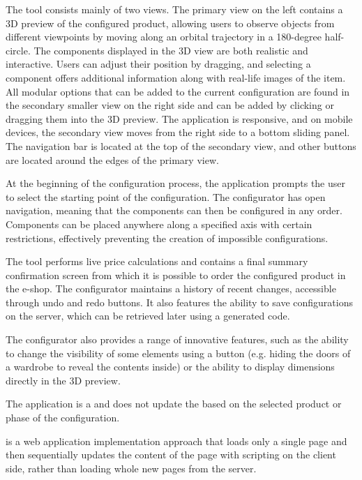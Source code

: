 The tool consists mainly of two views. The primary view on the left contains a 3D preview of the configured product, allowing users to observe objects from different viewpoints by moving along an orbital trajectory in a 180-degree half-circle. The components displayed in the 3D view are both realistic and interactive. Users can adjust their position by dragging, and selecting a component offers additional information along with real-life images of the item. All modular options that can be added to the current configuration are found in the secondary smaller view on the right side and can be added by clicking or dragging them into the 3D preview. The application is responsive, and on mobile devices, the secondary view moves from the right side to a bottom sliding panel. The navigation bar is located at the top of the secondary view, and other buttons are located around the edges of the primary view.

At the beginning of the configuration process, the application prompts the user to select the starting point of the configuration. The configurator has open navigation, meaning that the components can then be configured in any order. Components can be placed anywhere along a specified axis with certain restrictions, effectively preventing the creation of impossible configurations.

The tool performs live price calculations and contains a final summary confirmation screen from which it is possible to order the configured product in the e-shop. The configurator maintains a history of recent changes, accessible through undo and redo buttons. It also features the ability to save configurations on the server, which can be retrieved later using a generated code.

The configurator also provides a range of innovative features, such as the ability to change the visibility of some elements using a button (e.g. hiding the doors of a wardrobe to reveal the contents inside) or the ability to display dimensions directly in the 3D preview.

The application is a  and does not update the  based on the selected product or phase of the configuration.

 is a web application implementation approach that loads only a single page and then sequentially updates the content of the page with scripting on the client side, rather than loading whole new pages from the server.~\cite{Fink2014}


